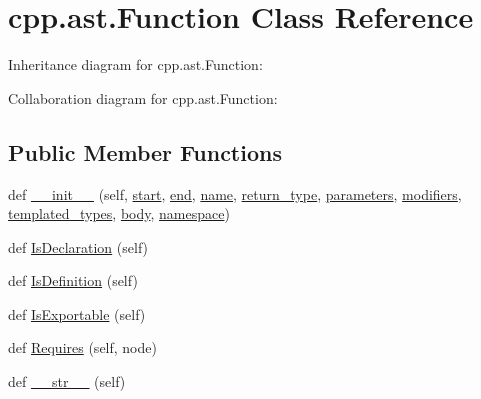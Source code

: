\hypertarget{classcpp_1_1ast_1_1_function}{}\section{cpp.\+ast.\+Function Class Reference}
\label{classcpp_1_1ast_1_1_function}


Inheritance diagram for cpp.\+ast.\+Function\+:


Collaboration diagram for cpp.\+ast.\+Function\+:
\subsection*{Public Member Functions}
\begin{DoxyCompactItemize}
\item 
def \hyperlink{classcpp_1_1ast_1_1_function_ab5270f5d353ec5e9dcd136e4cc6c7f6c}{\+\_\+\+\_\+init\+\_\+\+\_\+} (self, \hyperlink{classcpp_1_1ast_1_1_node_a7b2aa97e6a049bb1a93aea48c48f1f44}{start}, \hyperlink{classcpp_1_1ast_1_1_node_a3c5e5246ccf619df28eca02e29d69647}{end}, \hyperlink{classcpp_1_1ast_1_1___generic_declaration_af774f4729dfd78d0538a6782fe8514c1}{name}, \hyperlink{classcpp_1_1ast_1_1_function_af750fd788d7ab33163ee066534780212}{return\+\_\+type}, \hyperlink{classcpp_1_1ast_1_1_function_a0e61ef47af9cf2fd4402dbd8cab631ef}{parameters}, \hyperlink{classcpp_1_1ast_1_1_function_ad30eed435f1ff9ff34ade9cc0d7be121}{modifiers}, \hyperlink{classcpp_1_1ast_1_1_function_a57bb03218bade3240137a0d91c467cb6}{templated\+\_\+types}, \hyperlink{classcpp_1_1ast_1_1_function_a8e25e5016b23b38e32acf2df529c0650}{body}, \hyperlink{classcpp_1_1ast_1_1___generic_declaration_a8aee3f11b37449d54b42a78e0a689f46}{namespace})
\item 
def \hyperlink{classcpp_1_1ast_1_1_function_ab9120d9a774eb5860d220b3bcdcaa87e}{Is\+Declaration} (self)
\item 
def \hyperlink{classcpp_1_1ast_1_1_function_ad5d96144bd8418ac72332bffb21ea86f}{Is\+Definition} (self)
\item 
def \hyperlink{classcpp_1_1ast_1_1_function_a85a073cd69116bc6191f379d69d10d72}{Is\+Exportable} (self)
\item 
def \hyperlink{classcpp_1_1ast_1_1_function_a999e7b5e43517cd4d68b1aeea8a7d6e1}{Requires} (self, node)
\item 
def \hyperlink{classcpp_1_1ast_1_1_function_aaef91d6a3b1eb2703eebb32d39c45978}{\+\_\+\+\_\+str\+\_\+\+\_\+} (self)
\end{DoxyCompactItemize}
